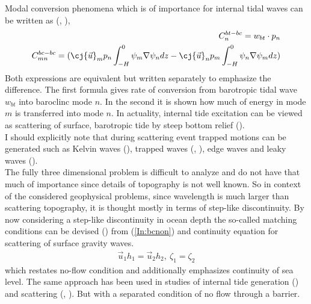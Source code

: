 Modal conversion phenomena which is of importance for internal tidal waves can be written as (\cite{griffiths2007internal}, \cite{kelly2012cascade}), 
\begin{align}
C_{n}^{bt-bc} = w_{bt} \cdot p_n\\
C_{mn}^{bc-bc} = (\cj{\vec{u}}_m p_n \int_{-H}^0 \psi_m \nabla \psi_n dz - \cj{\vec{u}}_n p_m \int_{-H}^0 \psi_n \nabla \psi_m dz)
\end{align}
Both expressions are equivalent but written separately to emphasize the difference. The first formula gives rate of conversion from barotropic tidal wave $w_{bt}$ into baroclinc mode $n$. In the second it is shown how much of energy in mode $m$ is transferred into mode $n$.  In actuality, internal tide excitation can be viewed as scattering of surface, barotropic tide by steep bottom relief (\cite{hendershott1981long}).\\
I should explicitly note that during scattering event trapped motions can be generated such as Kelvin waves (\cite{pinsent1972kelvin}), trapped waves (\cite{longuet1967trapping}, \cite{kowalik2002tidal}), edge waves and leaky waves (\cite{leblond1978preface}).\\
The fully three dimensional problem is difficult to analyze and do not have that much of importance since details of topography is not well known. So in context of the considered geophysical problems, since wavelength is much larger than scattering topography, it is thought mostly in terms of step-like discontinuity. By now considering a step-like discontinuity in ocean depth the so-called matching conditions can be devised (\cite{mei1989theory}) from (\ref{In:bcnon}) and continuity equation for scattering of surface gravity waves.
\begin{align*}
\vec{u}_1 h_1 = \vec{u}_2 h_2,~\zeta_1 = \zeta_2
\end{align*}
which restates no-flow condition and additionally emphasizes continuity of sea level. The same approach has been used in studies of internal tide generation (\cite{st2002role}) and scattering (\cite{larsen1969internal}, \cite{chapman1981scattering}). But with a separated condition of no flow through a barrier.\\

